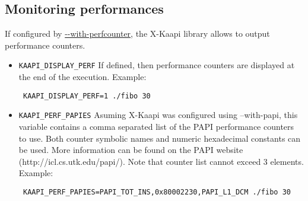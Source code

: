 \documentclass{article}
\newcommand{\kaapi}{\textsc{X}-Kaapi\xspace}
\begin{document}
\subsection{Monitoring performances}
If configured by \url{--with-perfcounter}, the \kaapi library allows to
output performance counters.

\begin{itemize}
\item \verb+KAAPI_DISPLAY_PERF+\newline
If defined, then performance counters are displayed at the end of the execution.
Example:
\begin{verbatim}
 KAAPI_DISPLAY_PERF=1 ./fibo 30
\end{verbatim}

\item \verb+KAAPI_PERF_PAPIES+\newline
Asuming \kaapi was configured using --with-papi, this variable contains a
comma separated list of the PAPI performance counters to use.
Both counter symbolic names and numeric hexadecimal constants can be used.
More information can be found on the PAPI website
(http://icl.cs.utk.edu/papi/).
Note that counter list cannot exceed 3 elements.
Example:
\begin{verbatim}
 KAAPI_PERF_PAPIES=PAPI_TOT_INS,0x80002230,PAPI_L1_DCM ./fibo 30
\end{verbatim}

\end{itemize}
\end{document}
